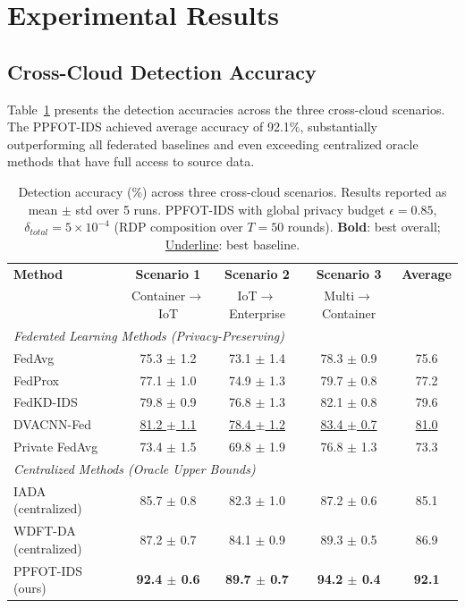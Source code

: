 \documentclass{ieeeaccess}
\theoremstyle{plain}
\theoremstyle{definition}
\theoremstyle{remark}
\begin{document}
\section{Experimental Results}
\label{sec:results}

\subsection{Cross-Cloud Detection Accuracy}

Table~\ref{tab:accuracy} presents the detection accuracies across the three cross-cloud scenarios. The PPFOT-IDS achieved average accuracy of 92.1\%, substantially outperforming all federated baselines and even exceeding centralized oracle methods that have full access to source data.

\begin{table}[!t]
\renewcommand{\arraystretch}{1.3}
\caption{Detection accuracy (\%) across three cross-cloud scenarios. Results reported as mean $\pm$ std over 5 runs. PPFOT-IDS with global privacy budget $\epsilon = 0.85$, $\delta_{total} = 5 \times 10^{-4}$ (RDP composition over $T = 50$ rounds). \textbf{Bold}: best overall; \underline{Underline}: best baseline.}
\label{tab:accuracy}
\centering
\begin{tabular}{lccc|c}
\hline
\textbf{Method} & \textbf{Scenario 1} & \textbf{Scenario 2} & \textbf{Scenario 3} & \textbf{Average} \\
 & Container$\to$IoT & IoT$\to$Enterprise & Multi$\to$Container & \\
\hline
\multicolumn{5}{l}{\textit{Federated Learning Methods (Privacy-Preserving)}} \\
FedAvg & 75.3 $\pm$ 1.2 & 73.1 $\pm$ 1.4 & 78.3 $\pm$ 0.9 & 75.6 \\
FedProx & 77.1 $\pm$ 1.0 & 74.9 $\pm$ 1.3 & 79.7 $\pm$ 0.8 & 77.2 \\
FedKD-IDS & 79.8 $\pm$ 0.9 & 76.8 $\pm$ 1.3 & 82.1 $\pm$ 0.8 & 79.6 \\
DVACNN-Fed & \underline{81.2 $\pm$ 1.1} & \underline{78.4 $\pm$ 1.2} & \underline{83.4 $\pm$ 0.7} & \underline{81.0} \\
Private FedAvg & 73.4 $\pm$ 1.5 & 69.8 $\pm$ 1.9 & 76.8 $\pm$ 1.3 & 73.3 \\
\hline
\multicolumn{5}{l}{\textit{Centralized Methods (Oracle Upper Bounds)}} \\
IADA (centralized) & 85.7 $\pm$ 0.8 & 82.3 $\pm$ 1.0 & 87.2 $\pm$ 0.6 & 85.1 \\
WDFT-DA (centralized) & 87.2 $\pm$ 0.7 & 84.1 $\pm$ 0.9 & 89.3 $\pm$ 0.5 & 86.9 \\
\hline
PPFOT-IDS (ours) & \textbf{92.4 $\pm$ 0.6} & \textbf{89.7 $\pm$ 0.7} & \textbf{94.2 $\pm$ 0.4} & \textbf{92.1} \\
\hline
\end{tabular}
\end{table}
\end{document}
